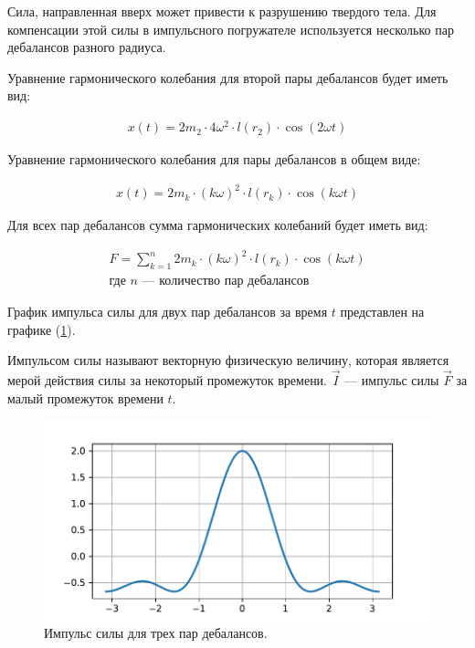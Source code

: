 Сила, направленная вверх может привести к разрушению твердого тела. Для компенсации этой силы в импульсного погружателе используется несколько пар дебалансов разного радиуса.

Уравнение гармонического колебания для второй пары дебалансов будет иметь вид:

\begin{equation*}
    \begin{aligned}
        x(t) = 2 m_2 \cdot 4 \omega^2 \cdot l(r_2) \cdot \cos (2 \omega t)
    \end{aligned}
\end{equation*}

Уравнение гармонического колебания для пары дебалансов в общем виде:

\begin{equation}\label{eq:harmonic_common}
    \begin{aligned}
        x(t) = 2 m_k \cdot (k \omega)^2 \cdot l(r_k) \cdot \cos (k \omega t)
    \end{aligned}
\end{equation}

Для всех пар дебалансов сумма гармонических колебаний будет иметь вид:

\begin{equation}\label{eq:harmonic_sum}
    \begin{gathered}
        F = \sum\limits_{k = 1}^n 2 m_k \cdot (k \omega)^2 \cdot l(r_k) \cdot \cos (k \omega t) \\
        \textrm{где $n$ --- количество пар дебалансов} 
    \end{gathered}
\end{equation}

График импульса силы для двух пар дебалансов за время $t$ представлен на графике (\ref{grap:impulse}).

\begin{definition}
    Импульсом силы называют векторную физическую величину, которая является мерой действия силы за некоторый промежуток времени. $\vec{I}$ --- импульс силы $\vec{F}$ за малый промежуток времени $t$.
\end{definition}

\begin{figure}[h]
    \centering
    \includegraphics[width=1\linewidth]{grap/impulse.pdf}
    \caption{Импульс силы для трех пар дебалансов.}
    \label{grap:impulse}
\end{figure}


